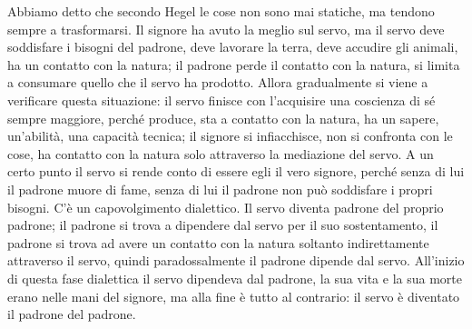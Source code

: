 \documentclass[a4paper,12pt,oneside,openany]{book}%
\begin{document}
Abbiamo detto che secondo Hegel le cose non sono mai statiche, ma tendono sempre a trasformarsi. Il signore ha avuto la meglio sul servo, ma il servo deve soddisfare i bisogni del padrone, deve lavorare la terra, deve accudire gli animali, ha un contatto con la natura; il padrone perde il contatto con la natura, si limita a consumare quello che il servo ha prodotto. Allora gradualmente si viene a verificare questa situazione: il servo finisce con l’acquisire una coscienza di sé sempre maggiore, perché produce, sta a contatto con la natura, ha un sapere, un’abilità, una capacità tecnica; il signore si infiacchisce, non si confronta con le cose, ha contatto con la natura solo attraverso la mediazione del servo. A un certo punto il servo si rende conto di essere egli il vero signore, perché senza di lui il padrone muore di fame, senza di lui il padrone non può soddisfare i propri bisogni. C’è un capovolgimento dialettico. Il servo diventa padrone del proprio padrone; il padrone si trova a dipendere dal servo per il suo sostentamento, il padrone si trova ad avere un contatto con la natura soltanto indirettamente attraverso il servo, quindi paradossalmente il padrone dipende dal servo. All’inizio di questa fase dialettica il servo dipendeva dal padrone, la sua vita e la sua morte erano nelle mani del signore, ma alla fine è tutto al contrario: il servo è diventato il padrone del padrone.
\end{document}
